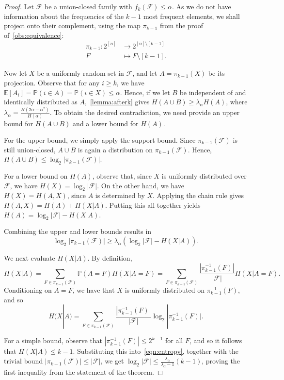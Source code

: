 \documentclass[10pt,a4paper]{amsart}
\newcommand{\E}{\mathbb{E}}
\newcommand{\F}{\mathcal{F}}
\renewcommand{\Pr}{\mathbb{P}}
\begin{document}
	\begin{proof}
            Let $\F$ be a union-closed family with $f_k(\F) \le \alpha$. As we do not have information about the frequencies of the $k-1$ most frequent elements, we shall project onto their complement, using the map $\pi_{k-1}$ from the proof of~\cref{obs:equivalence}:
	\begin{align*}
		\pi_{k-1}: 2^{[n]}&\to 2^{[n]\setminus[k-1]}\\
		F&\mapsto F\setminus [k-1].
	\end{align*}
	
        Now let $X$ be a uniformly random set in $\F$, and let $A = \pi_{k-1}(X)$ be its projection. Observe that for any $i \ge k$, we have $\E[A_i] = \Pr(i \in A) = \Pr(i \in X) \le \alpha$. Hence, if we let $B$ be independent of and identically distributed as $A$,~\cref{lemma:afterk} gives $H(A\cup B)\geq \lambda_\alpha H(A)$, where $\lambda_{\alpha}=\frac{H(2\alpha-\alpha^2)}{H(\alpha)}$. To obtain the desired contradiction, we need provide an upper bound for $H(A\cup B)$ and a lower bound for $H(A)$. 	
	
	For the upper bound, we simply apply the support bound. Since $\pi_{k-1}(\F)$ is still union-closed, $A\cup B$ is again a distribution on $\pi_{k-1}(\F)$. Hence, $H(A\cup B)\leq \log_2|\pi_{k-1}(\F)|$. 
	
	For a lower bound on $H(A)$, observe that, since $X$ is uniformly distributed over $\F$, we have $H(X) = \log_2 |\F|$. On the other hand, we have $H(X)=H(A,X)$, since $A$ is determined by $X$. Applying the chain rule gives $H(A,X)=H(A)+H(X|A)$. Putting this all together yields $H(A)=\log_2|\F|-H(X|A)$.

    Combining the upper and lower bounds results in
    \begin{equation} \label{eqn:entropy}
        \log_2 |\pi_{k-1}(\F)| \ge \lambda_\alpha \left( \log_2 |\F| - H(X|A) \right).
    \end{equation}
    
    We next evaluate $H(X|A)$. By definition, 
    \[ H(X|A) = \sum_{F \in \pi_{k-1}(\F)} \Pr(A = F)H(X|A = F) = \sum_{F \in \pi_{k-1}(\F)} \frac{|\pi_{k-1}^{-1}(F)|}{|\F|} H(X|A=F). \] 
    Conditioning on $A = F$, we have that $X$ is uniformly distributed on $\pi_{k-1}^{-1}(F)$, and so 
    \[ H(X|A) = \sum_{F \in \pi_{k-1}(\F)} \frac{|\pi_{k-1}^{-1}(F)|}{|\F|} \log_2 |\pi_{k-1}^{-1}(F)|. \]

    For a simple bound, observe that $|\pi_{k-1}^{-1}(F)| \le 2^{k-1}$ for all $F$, and so it follows that $H(X|A) \le k-1$. Substituting this into~\eqref{eqn:entropy}, together with the trivial bound $|\pi_{k-1}(\F)| \le |\F|$, we get $\log_2 |\F| \le \frac{\lambda_{\alpha}}{\lambda_{\alpha} - 1} (k-1)$, proving the first inequality from the statement of the theorem.


\end{proof}
\end{document}
